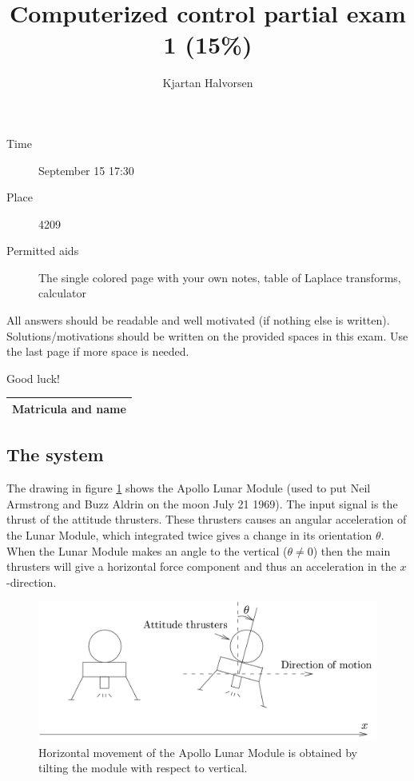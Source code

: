 \documentclass[letter,11pt]{scrartcl}
\title{Computerized control partial exam 1 (15\%)}
\author{Kjartan Halvorsen}
\date{}
\newcommand{\bmpl}{\begin{minipage}[t]{\textwidth}}
\newcommand{\emp}{\end{minipage}}
\begin{document}
\maketitle


\begin{description}
\item[Time] September 15 17:30
\item[Place] 4209
\item[Permitted aids] The single colored page with your own notes, table of Laplace transforms, calculator
\end{description}

All answers should be readable and well motivated (if nothing else is written). Solutions/motivations should be written on the provided spaces in this exam. Use the last page if more space is needed.

\begin{center}
{\Large Good luck!} \\
\end{center}

\begin{tabular}{|l|l|}
\hline
\multicolumn{2}{|l|}{\bmpl
Matricula and name
\vspace*{18mm}
\emp}\\
\hline

\end{tabular}


\subsection*{The system}
The drawing in figure \ref{fig:apollo-sketch} shows the Apollo Lunar Module (used to put Neil Armstrong and Buzz Aldrin on the moon July 21 1969). The input signal is the thrust of the attitude thrusters. These thrusters causes an angular acceleration of the Lunar Module, which integrated twice gives a change in its orientation $\theta$.  When the Lunar Module makes an angle to the vertical ($\theta \neq 0$) then the main thrusters will give a horizontal force component and thus an acceleration in the $x$-direction. 
\begin{figure}[hbtp]
\begin{center}
  \includegraphics[width=0.6\linewidth]{apollo-2.png}
\end{center}
\caption{Horizontal movement of the Apollo Lunar Module is obtained by tilting the module with respect to vertical.}
\label{fig:apollo-sketch}
\end{figure}
\end{document}
